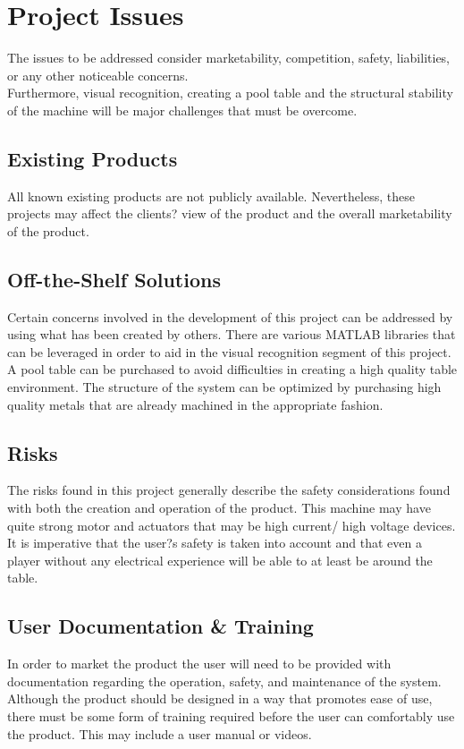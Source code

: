 \documentclass[titlepage]{article}
\begin{document}
\section{Project Issues}
The issues to be addressed consider marketability, competition, safety, liabilities, or any other noticeable concerns.\\
Furthermore, visual recognition, creating a pool table and the structural stability of the machine will be major challenges that must be overcome.
\subsection{Existing Products}
All known existing products are not publicly available. Nevertheless, these projects may affect the clients? view of the product and the overall marketability of the product.

\subsection{Off-the-Shelf Solutions}
Certain concerns involved in the development of this project can be addressed by using what has been created by others. There are various MATLAB libraries that can be leveraged in order to aid in the visual recognition segment of this project. A pool table can be purchased to avoid difficulties in creating a high quality table environment. The structure of the system can be optimized by purchasing high quality metals that are already machined in the appropriate fashion.

\subsection{Risks}
The risks found in this project generally describe the safety considerations found with both the creation and operation of the product. This machine may have quite strong motor and actuators that may be high current/ high voltage devices. It is imperative that the user?s safety is taken into account and that even a player without any electrical experience will be able to at least be around the table.

\subsection{User Documentation \& Training}
In order to market the product the user will need to be provided with documentation regarding the operation, safety, and maintenance of the system. Although the product should be designed in a way that promotes ease of use, there must be some form of training required before the user can comfortably use the product. This may include a user manual or videos.




\pagebreak
\printindex
\end{document}
